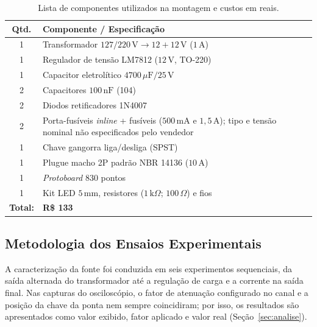 \begin{table}[H]
\caption{Lista de componentes utilizados na montagem e custos em reais.}
\label{tab:bom}
\centering
\scriptsize
\setlength{\tabcolsep}{3pt}
\begin{tabular}{cp{6.5cm}}
\hline
Qtd. & Componente / Especificação \\
\hline
1 & Transformador $127/220\,\text{V} \to 12+12\,\text{V}$ ($1\,\text{A}$) \\
1 & Regulador de tensão LM7812 ($12\,\text{V}$, TO-220) \\
1 & Capacitor eletrolítico $4700\,\mu\text{F} / 25\,\text{V}$ \\
2 & Capacitores $100\,\text{nF}$ (104) \\
2 & Diodos retificadores 1N4007 \\
2 & Porta-fusíveis \textit{inline} + fusíveis ($500\,\text{mA}$ e $1{,}5\,\text{A}$); tipo e tensão nominal não especificados pelo vendedor \\
1 & Chave gangorra liga/desliga (SPST) \\
1 & Plugue macho 2P padrão NBR 14136 ($10\,\text{A}$) \\
1 & \textit{Protoboard} $830$ pontos \\
1 & Kit LED $5\,\text{mm}$, resistores ($1\,\text{k}\Omega$; $100\,\Omega$) e fios \\
\hline
\textbf{Total:} & \textbf{R\$ 133} \\
\hline
\end{tabular}
\end{table}

\subsection{Metodologia dos Ensaios Experimentais}

A caracterização da fonte foi conduzida em seis experimentos sequenciais, da saída alternada do transformador até a regulação de carga e a corrente na saída final. Nas capturas do osciloscópio, o fator de atenuação configurado no canal e a posição da chave da ponta nem sempre coincidiram; por isso, os resultados são apresentados como valor exibido, fator aplicado e valor real (Seção~\ref{sec:analise}).

